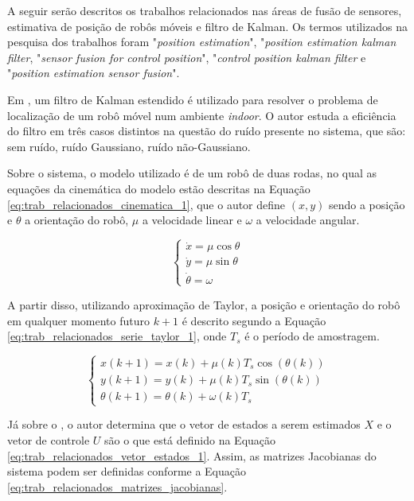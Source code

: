 \documentclass[acronym, symbols, table]{fei}
\begin{document}
	A seguir serão descritos os trabalhos relacionados nas áreas de fusão de sensores, estimativa de posição de robôs móveis e filtro de Kalman. Os termos utilizados na pesquisa dos trabalhos foram "\textit{position estimation}", "\textit{position estimation kalman filter}, "\textit{sensor fusion for control position}", "\textit{control position kalman filter} e "\textit{position estimation sensor fusion}".
	
	Em \textcite{eman2020mobile}, um filtro de Kalman estendido é utilizado para resolver o problema de localização de um robô móvel num ambiente \textit{indoor}. O autor estuda a eficiência do filtro em três casos distintos na questão do ruído presente no sistema, que são: sem ruído, ruído Gaussiano, ruído não-Gaussiano.
	
	Sobre o sistema, o modelo utilizado é de um robô de duas rodas, no qual as equações da cinemática do modelo estão descritas na Equação \eqref{eq:trab_relacionados_cinematica_1}, que o autor define $(x, y)$ sendo a posição e $\theta$ a orientação do robô, $\mu$ a velocidade linear e $\omega$ a velocidade angular.
	
	\begin{equation}\label{eq:trab_relacionados_cinematica_1}
		\begin{cases}
			\dot{x} = \mu \cos{\theta} \\
			\dot{y} = \mu \sin{\theta} \\
			\dot{\theta} = \omega
		\end{cases}
	\end{equation}
	
	A partir disso, utilizando aproximação de Taylor, a posição e orientação do robô em qualquer momento futuro $k + 1$ é descrito segundo a Equação \eqref{eq:trab_relacionados_serie_taylor_1}, onde $T_s$ é o período de amostragem.
	
	\begin{equation} \label{eq:trab_relacionados_serie_taylor_1}
		\begin{cases*}
			x(k+1) = x(k) + \mu(k)T_s\cos{(\theta(k))} \\
			y(k+1) = y(k) + \mu(k)T_s\sin{(\theta(k))} \\
			\theta(k+1) = \theta(k) + \omega(k)T_s
		\end{cases*}
	\end{equation}
	
	Já sobre o , o autor determina que o vetor de estados a serem estimados $X$ e o vetor de controle $U$ são o que está definido na Equação \eqref{eq:trab_relacionados_vetor_estados_1}. Assim, as matrizes Jacobianas do sistema podem ser definidas conforme a Equação \eqref{eq:trab_relacionados_matrizes_jacobianas}.
	
\end{document}
